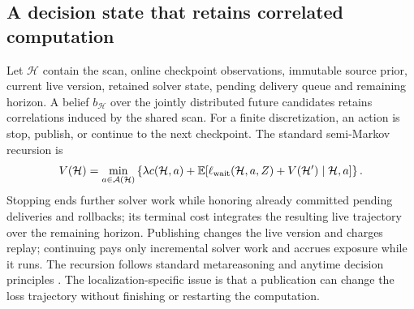 \subsection{A decision state that retains correlated computation}
Let $\mathcal H$ contain the scan, online checkpoint observations, immutable source prior, current live version, retained solver state, pending delivery queue and remaining horizon. A belief $b_{\mathcal H}$ over the jointly distributed future candidates retains correlations induced by the shared scan. For a finite discretization, an action is stop, publish, or continue to the next checkpoint. The standard semi-Markov recursion is
\begin{equation}
V(\mathcal H)=\min_{a\in\mathcal A(\mathcal H)}
\left\{\lambda c(\mathcal H,a)+\mathbb E\!\left[\ell_{\rm wait}(\mathcal H,a,Z)+V(\mathcal H')\mid\mathcal H,a\right]\right\}.\label{eq:bellman}
\end{equation}
Stopping ends further solver work while honoring already committed pending deliveries and rollbacks; its terminal cost integrates the resulting live trajectory over the remaining horizon. Publishing changes the live version and charges replay; continuing pays only incremental solver work and accrues exposure while it runs. The recursion follows standard metareasoning and anytime decision principles \cite{russell1991meta,zilberstein1996anytime,hay2012}. The localization-specific issue is that a publication can change the loss trajectory without finishing or restarting the computation.

